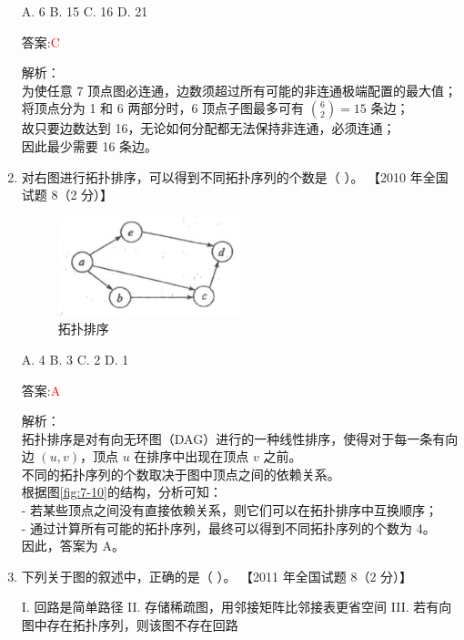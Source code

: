\documentclass[lang=cn,newtx,10pt,scheme=chinese]{../../../elegantbook}
\begin{document}
\begin{enumerate}
    A. 6  
    B. 15  
    C. 16  
    D. 21

    答案:\textcolor{red}{C}

    解析：\\
    为使任意 7 顶点图必连通，边数须超过所有可能的非连通极端配置的最大值；\\
    将顶点分为 1 和 6 两部分时，6 顶点子图最多可有 $\binom{6}{2}=15$ 条边；\\
    故只要边数达到 16，无论如何分配都无法保持非连通，必须连通；\\
    因此最少需要 16 条边。\\

    
        \item 对右图进行拓扑排序，可以得到不同拓扑序列的个数是（ ）。  
        【2010 年全国试题 8（2 分）】  

        \begin{figure}[h!]
            \centering
            \includegraphics[width=0.5\textwidth]{../../figure/exercisePicPDF/chapter7/7-10.pdf}
            \caption{拓扑排序}
        \end{figure}

        A. 4 \quad B. 3 \quad C. 2 \quad D. 1  
    
        答案:\textcolor{red}{A}

        解析：\\
        拓扑排序是对有向无环图（DAG）进行的一种线性排序，使得对于每一条有向边 $(u, v)$，顶点 $u$ 在排序中出现在顶点 $v$ 之前。\\
        不同的拓扑序列的个数取决于图中顶点之间的依赖关系。\\
        根据图\ref{fig:7-10}的结构，分析可知：\\
        - 若某些顶点之间没有直接依赖关系，则它们可以在拓扑排序中互换顺序；\\
        - 通过计算所有可能的拓扑序列，最终可以得到不同拓扑序列的个数为 4。\\
        因此，答案为 A。
        \item 下列关于图的叙述中，正确的是（ ）。  
        【2011 年全国试题 8（2 分）】
    
        I. 回路是简单路径  
        II. 存储稀疏图，用邻接矩阵比邻接表更省空间  
        III. 若有向图中存在拓扑序列，则该图不存在回路  
    

\end{enumerate}
\end{document}
